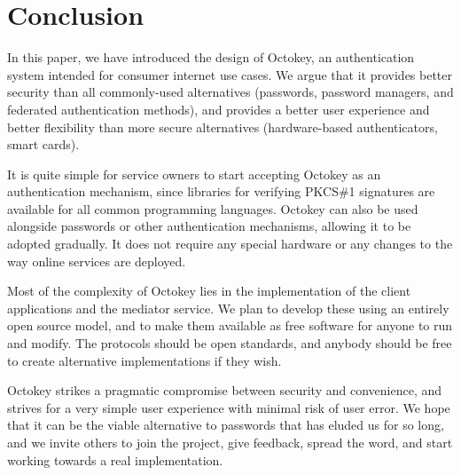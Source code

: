 %
%
%

\section{Conclusion}

In this paper, we have introduced the design of Octokey, an authentication system intended for
consumer internet use cases. We argue that it provides better security than all commonly-used
alternatives (passwords, password managers, and federated authentication methods), and provides a
better user experience and better flexibility than more secure alternatives (hardware-based
authenticators, smart cards).

It is quite simple for service owners to start accepting Octokey as an authentication mechanism,
since libraries for verifying PKCS\#1 signatures are available for all common programming languages.
Octokey can also be used alongside passwords or other authentication mechanisms, allowing it to be
adopted gradually. It does not require any special hardware or any changes to the way online
services are deployed.

Most of the complexity of Octokey lies in the implementation of the client applications and the
mediator service. We plan to develop these using an entirely open source model, and to make them
available as free software for anyone to run and modify. The protocols should be open standards, and
anybody should be free to create alternative implementations if they wish.

Octokey strikes a pragmatic compromise between security and convenience, and strives for a very
simple user experience with minimal risk of user error. We hope that it can be the viable
alternative to passwords that has eluded us for so long, and we invite others to join the project,
give feedback, spread the word, and start working towards a real implementation.
